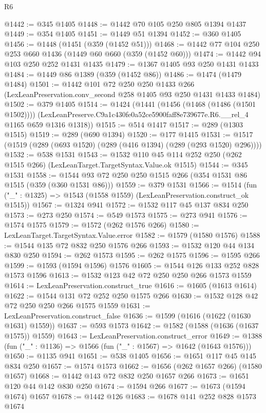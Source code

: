 \begin{lexlean}{R6}
\begin{coremodule}
@1442 := @345 @1405
@1448 := @1442 @70 @105 @250 @805 @1394 @1437
@1449 := @354 @1405
@1451 := @1449 @51 @1394
@1452 := @360 @1405
@1456 := @1448 (@1451 (@359 (@1452 @51)))
@1468 := @1442 @77 @104 @250 @253 @660 @1436 (@1449 @60 @660 (@359 (@1452 @60)))
@1474 := @1442 @94 @103 @250 @252 @1431 @1435
@1479 := @1367 @1405 @93 @250 @1431 @1433
@1484 := @1449 @86 @1389 (@359 (@1452 @86))
@1486 := @1474 (@1479 @1484)
@1501 := @1442
    @101
    @72
    @250
    @250
    @1433
    @266
    (LexLeanPreservation.conv_second @258 @1405 @93 @250 @1431 @1433 @1484)
@1502 := @379 @1405
@1514 := @1424
    (@1441
      (@1456 (@1468 (@1486 (@1501 @1502))))
      (LexLeanPreserve.C9a1c430fe0a52ce5900faff8e739677e.R6.__rel_4 @1165 @659 @1316 @1318))
@1515 := @514 @1417
@1517 := @289 (@1303 @1515)
@1519 := @289 (@690 @1394)
@1520 := @177 @1415
@1531 := @1517 (@1519 (@289 (@693 @1520) (@289 (@416 @1394) (@289 (@293 @1520) @296))))
@1532 := @538 @1531
@1543 := @1532 @110 @45 @114 @252 @250 (@262 @1515 @266) (LexLeanTarget.TargetSyntax.Value.ok @1515)
@1544 := @345 @1531
@1558 := @1544 @93 @72 @250 @250 @1515 @266 (@354 @1531 @86 @1515 (@359 (@360 @1531 @86)))
@1559 := @379 @1531
@1566 := @1514 (fun ("_" : @1325) => @1543 (@1558 @1559) (LexLeanPreservation.construct_ok @1515))
@1567 := @1324 @941
@1572 := @1532 @117 @45 @137 @834 @250
@1573 := @273 @250
@1574 := @549 @1573
@1575 := @273 @941
@1576 := @1574 @1575
@1579 := @1572 (@262 @1576 @266)
@1580 := LexLeanTarget.TargetSyntax.Value.error
@1582 := @1579 (@1580 @1576)
@1588 := @1544 @135 @72 @832 @250 @1576 @266
@1593 := @1532 @120 @44 @134 @830 @250
@1594 := @262 @1573
@1595 := @262 @1575
@1596 := @1595 @266
@1599 := @1593 (@1594 @1596) @1576
@1605 := @1544 @126 @133 @252 @828 @1573 @1596
@1613 := @1532 @123 @42 @72 @250 @250 @266 @1573 @1559
@1614 := LexLeanPreservation.construct_true
@1616 := @1605 (@1613 @1614)
@1622 := @1544 @131 @72 @252 @250 @1575 @266
@1630 := @1532 @128 @42 @72 @250 @250 @266 @1575 @1559
@1631 := LexLeanPreservation.construct_false
@1636 := @1599 (@1616 (@1622 (@1630 @1631) @1559))
@1637 := @593 @1573
@1642 := @1582 (@1588 (@1636 (@1637 @1575)) @1559)
@1643 := LexLeanPreservation.construct_error
@1649 := @1388 (fun ("_" : @1136) => @1566 (fun ("_" : @1567) => @1642 (@1643 @1576)))
@1650 := @1135 @941
@1651 := @538 @1405
@1656 := @1651 @117 @45 @145 @834 @250
@1657 := @1574 @1573
@1662 := @1656 (@262 @1657 @266) (@1580 @1657)
@1668 := @1442 @143 @72 @832 @250 @1657 @266
@1673 := @1651 @120 @44 @142 @830 @250
@1674 := @1594 @266
@1677 := @1673 (@1594 @1674) @1657
@1678 := @1442 @126
@1683 := @1678 @141 @252 @828 @1573 @1674

\end{coremodule}
\end{lexlean}
